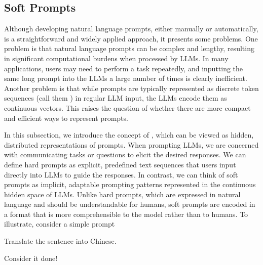 \subsection{Soft Prompts}

\noindent Although developing natural language prompts, either manually or automatically, is a straightforward and widely applied approach, it presents some problems. One problem is that natural language prompts can be complex and lengthy, resulting in significant computational burdens when processed by LLMs. In many applications, users may need to perform a task repeatedly, and inputting the same long prompt into the LLMs a large number of times is clearly inefficient. Another problem is that while prompts are typically represented as discrete token sequences (call them ) in regular LLM input, the LLMs encode them as continuous vectors. This raises the question of whether there are more compact and efficient ways to represent prompts.

In this subsection, we introduce the concept of , which can be viewed as hidden, distributed representations of prompts. When prompting LLMs, we are concerned with communicating tasks or questions to elicit the desired responses. We can define hard prompts as explicit, predefined text sequences that users input directly into LLMs to guide the responses. In contrast, we can think of soft prompts as implicit, adaptable prompting patterns represented in the continuous hidden space of LLMs. Unlike hard prompts, which are expressed in natural language and should be understandable for humans, soft prompts are encoded in a format that is more comprehensible to the model rather than to humans. To illustrate, consider a simple prompt

\vspace{0.5em}
\begin{tcolorbox}

\begingroup
\setlength{\leftskip}{2em}
\setlength{\rightskip}{2em}

Translate the sentence into Chinese.

\vspace{0.5em}

Consider it done!

\vspace{0.5em}

\underline{\hspace{2em}}

\endgroup

\end{tcolorbox}
\vspace{0.5em}

